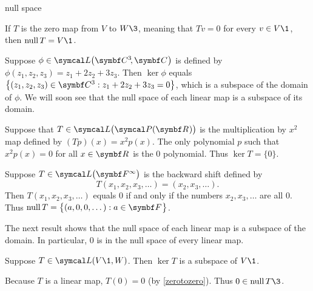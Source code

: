 \begin{example}[null]{null space}

\begin{Itemize}
\item
If $T$ is the zero map from $V$ to $W\3$, meaning that $Tv = 0$ for every $v \in V\1$, then $\ker T = V\1$.
\item
Suppose $\phi \in \L\paren[\big]{\CC3, \C{}}$ is defined by $\phi(z_1, z_2, z_3) = z_1 + 2z_2 + 3z_3$. Then
$\ker \phi$ equals $\br[\big]{(z_1, z_2, z_3) \in \C3: z_1 + 2z_2 + 3z_3 = 0}$, which is a subspace of the domain of $\phi$. We will soon see that the null space of each linear map is a subspace of its domain.
\item
{}
\item
Suppose that $T\in \L\bigl(\P(\R{})\bigr)$ is the multiplication by $x^2$ map defined
by $(Tp)(x) = x^2 p(x)$. The only polynomial $p$ such that $x^2 p(x) = 0$
for all $x \in \R{}$ is the $0$ polynomial.  Thus $
\ker T = \{ 0 \}$.
\item
Suppose $T\in \L\paren[\big]{\F{\infty}}$ is the backward shift defined by
\[
T(x_1, x_2, x_3, \dots) = (x_2, x_3, \dots).
\]
Then $T(x_1, x_2, x_3, \dots)$ equals $0$ if and only if
the numbers $x_2, x_3, \dots$ are all $0$.  Thus
$
\ker T = \br[\big]{ (a, 0, 0, \dots): a \in \F{} }$.
\end{Itemize}
\exampleitemend
\end{example}

The next result shows that the null space of each linear map is a subspace of
the domain.  In particular, $0$ is in the null space of every linear map.

%
{Suppose $T \in \L(V\1,W)$. Then\/ $\ker T$ is a subspace of\/ $V\1$.
}


\proof
Because $T$ is a linear map, $T(0) = 0$ (by \ref{zerotozero}).  Thus $0 \in \ker T\3$.

